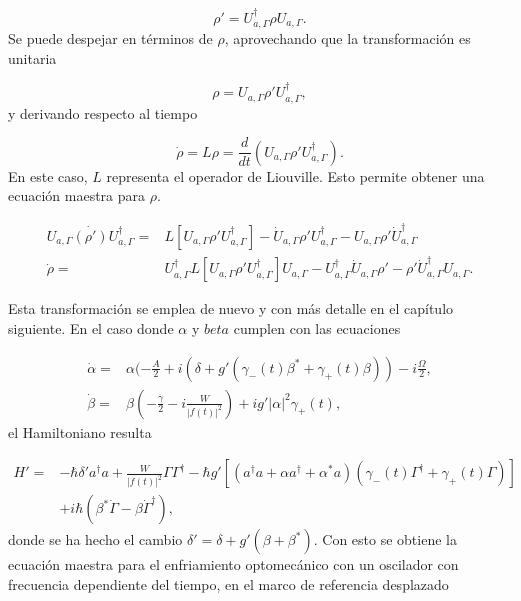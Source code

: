 \documentclass[10pt,a4paper]{report}
\begin{document}
\begin{equation}
\rho' = U_{a,\Gamma}^\dagger \rho U_{a,\Gamma}.
\end{equation} Se puede despejar en términos de $\rho$, aprovechando que la transformación es unitaria

\begin{equation}
\rho = U_{a,\Gamma} \rho' U_{a,\Gamma}^\dagger,
\end{equation} y derivando respecto al tiempo

\begin{equation}
\dot{\rho} = L\rho = \frac{d}{dt}(U_{a,\Gamma} \rho' U_{a,\Gamma}^\dagger).
\end{equation} En este caso, $L$ representa el operador de Liouville. Esto permite obtener una ecuación maestra para $\rho$. 

\begin{align}
 U_{a,\Gamma} \dot{(\rho')} U_{a,\Gamma}^\dagger =& L[U_{a,\Gamma} \rho' U_{a,\Gamma}^\dagger] - \dot{U}_{a,\Gamma}\rho'U_{a,\Gamma}^\dagger -U_{a,\Gamma} \rho' \dot{U}_{a,\Gamma}^\dagger\\
\dot{\rho} =& U_{a,\Gamma}^\dagger L[U_{a,\Gamma} \rho' U_{a,\Gamma}^\dagger]U_{a,\Gamma}-U_{a,\Gamma}^\dagger\dot{U}_{a,\Gamma}\rho'-\rho'\dot{U}_{a,\Gamma}^\dagger U_{a,\Gamma}.
\end{align}

Esta transformación se emplea de nuevo y con más detalle en el capítulo siguiente. En el caso donde $\alpha$ y $beta$ cumplen con las ecuaciones

\begin{align}
\dot{\alpha} =& \alpha(-\frac{A}{2}+i(\delta+g'(\gamma_-(t) \beta^* + \gamma_+(t) \beta))-i\frac{\Omega}{2},\\
\dot{\beta} =& \beta(-\frac{\gamma}{2}-i\frac{W}{|f(t)|^2})+ig'|\alpha|^2\gamma_+(t),
\end{align} el Hamiltoniano resulta


\begin{align*}
H'=& -\hbar \delta' a^\dagger a + \frac{W}{|f(t)|^2}\Gamma \Gamma^\dagger -\hbar g'[(a^{\dagger}a +\alpha a^{\dagger}+\alpha^* a)(\gamma_-(t)\Gamma^{\dagger}+\gamma_+(t)\Gamma)]\\
&+ i\hbar(\beta^*\dot{\Gamma} - \beta \dot{\Gamma}^\dagger),
\end{align*}  donde se ha hecho el cambio $\delta' = \delta + g'(\beta + \beta^*)$. Con esto se obtiene la ecuación maestra para el enfriamiento optomecánico con un oscilador con frecuencia dependiente del tiempo, en el marco de referencia desplazado
\end{document}
